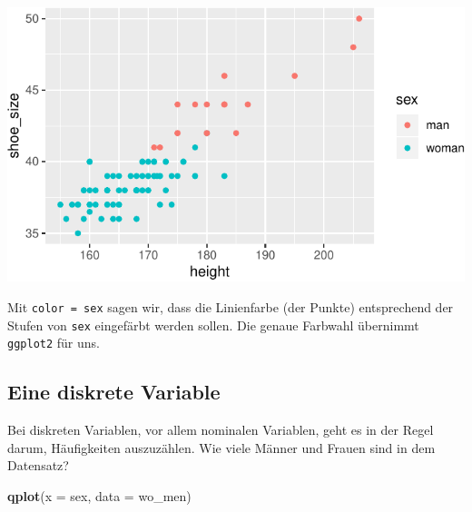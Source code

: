 \documentclass[12pt,ngerman,paper=a4,pagesize,DIV=13]{scrreprt}
\newenvironment{Shaded}{\begin{snugshade}}{\end{snugshade}}
\newcommand{\DataTypeTok}[1]{\textcolor[rgb]{0.13,0.29,0.53}{#1}}
\newcommand{\DecValTok}[1]{\textcolor[rgb]{0.00,0.00,0.81}{#1}}
\newcommand{\KeywordTok}[1]{\textcolor[rgb]{0.13,0.29,0.53}{\textbf{#1}}}
\newcommand{\NormalTok}[1]{#1}
\newcommand{\OperatorTok}[1]{\textcolor[rgb]{0.81,0.36,0.00}{\textbf{#1}}}
\newcommand{\StringTok}[1]{\textcolor[rgb]{0.31,0.60,0.02}{#1}}
\begin{document}
\begin{Shaded}
\end{Shaded}

\includegraphics{DatenerhebungStatistik-Uebung_files/figure-latex/unnamed-chunk-249-1.pdf}

Mit \texttt{color\ =\ sex} sagen wir, dass die Linienfarbe (der Punkte)
entsprechend der Stufen von \texttt{sex} eingefärbt werden sollen. Die
genaue Farbwahl übernimmt \texttt{ggplot2} für uns.

\hypertarget{eine-diskrete-variable}{%
\subsection{Eine diskrete Variable}\label{eine-diskrete-variable}}

Bei diskreten Variablen, vor allem nominalen Variablen, geht es in der
Regel darum, Häufigkeiten auszuzählen. Wie viele Männer und Frauen sind
in dem Datensatz?

\begin{Shaded}
\begin{Highlighting}[]
\KeywordTok{qplot}\NormalTok{(}\DataTypeTok{x =}\NormalTok{ sex, }\DataTypeTok{data =}\NormalTok{ wo_men)}
\end{Highlighting}
\end{Shaded}
\end{document}
